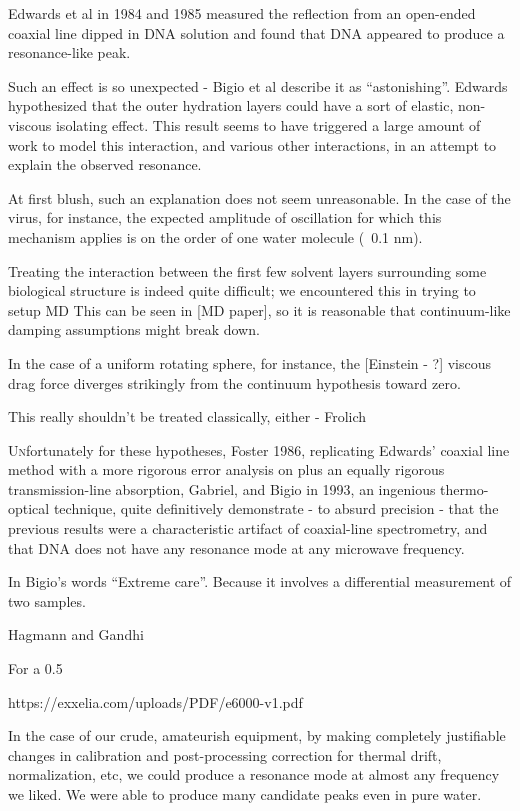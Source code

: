\documentclass[paper.tex]{subfiles}
\begin{document}
\begin{multicols}{1}
Edwards et al in 1984 and 1985 measured the reflection from an open-ended coaxial line dipped in DNA solution and found that DNA appeared to produce a resonance-like peak.

Such an effect is so unexpected - Bigio et al describe it as “astonishing”. Edwards hypothesized that the outer hydration layers could have a sort of elastic, non-viscous isolating effect. This result seems to have triggered a large amount of work to model this interaction, and various other interactions, in an attempt to explain the observed resonance.

At first blush, such an explanation does not seem unreasonable. In the case of the virus, for instance, the expected amplitude of oscillation for which this mechanism applies is on the order of one water molecule (~0.1 nm).

Treating the interaction between the first few solvent layers surrounding some biological structure is indeed quite difficult; we encountered this in trying to setup MD This can be seen in [MD paper], so it is reasonable that continuum-like damping assumptions might break down. 

In the case of a uniform rotating sphere, for instance, the [Einstein - ?] viscous drag force diverges strikingly from the continuum hypothesis toward zero.

This really shouldn’t be treated classically, either - Frolich 

\lettrine{U}nfortunately for these hypotheses, Foster 1986, replicating Edwards’ coaxial line method with a more rigorous error analysis on plus an equally rigorous transmission-line absorption, Gabriel, and Bigio in 1993, an ingenious thermo-optical technique, quite definitively demonstrate - to absurd precision -  that the previous results were a characteristic artifact of coaxial-line spectrometry, and that DNA does not have any resonance mode at any microwave frequency.

In Bigio’s words “Extreme care”. Because it involves a differential measurement of two samples.

Hagmann and Gandhi \cite{Substitution1982}



For a 0.5%

https://exxelia.com/uploads/PDF/e6000-v1.pdf


In the case of our crude, amateurish equipment, by making completely justifiable changes in calibration and post-processing correction for thermal drift, normalization, etc, we could produce a resonance mode at almost any frequency we liked. We were able to produce many candidate peaks even in pure water.



\end{multicols}
\end{document}
